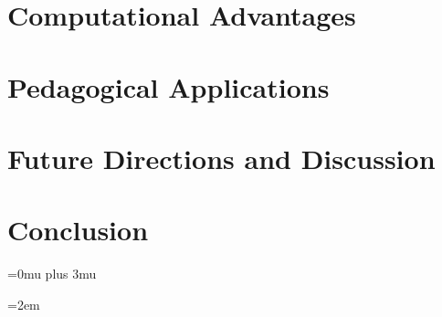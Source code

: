 \documentclass[10pt,twocolumn]{article}
\begin{document}
\section{Computational Advantages}


\section{Pedagogical Applications}


\section{Future Directions and Discussion}


\section{Conclusion}


\appendix



% 
% 
% 
% 

\nocite{*}

\makeatletter
\def\url@leostyle{\@ifundefined{selectfont}{\def\UrlFont{\sf}}{\def\UrlFont{\small\ttfamily}}}
\makeatother
{}

\Urlmuskip=0mu plus 3mu

\sloppy
\emergencystretch=2em



\end{document}

